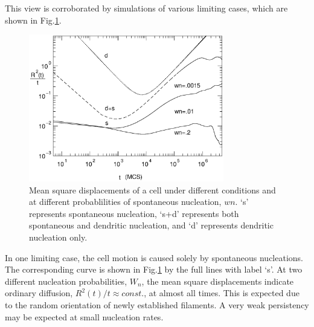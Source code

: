 \documentclass[aps,preprint,pre,array,epsfig,eqsecnum]{revtex4}
\begin{document}
This view is corroborated by simulations of various limiting cases, which are
shown in Fig.\ref{fig:msd}.
\begin{figure}[h] %
  \begin{center}
    \includegraphics[width=0.76\textwidth, angle=0]
{Nandy4.eps}    
    \caption{Mean square displacements of a cell under different 
    conditions and at different probablilities of spontaneous nucleation, $wn$.
     `s' represents spontaneous nucleation, `s+d' represents both 
     spontaneous and dendritic nucleation, and `d' represents  dendritic
     nucleation only.}  
    \label{fig:msd}
  \end{center}
\end{figure}
%

In one limiting case, the cell motion is caused solely by spontaneous
nucleations.
The corresponding curve 
is shown in Fig.\ref{fig:msd} by the full lines with label `s'.
At two different nucleation probabilities, $W_n$, the mean square
displacements indicate
ordinary diffusion, $R^2(t)/t \approx const.$, at almost all times.
This is expected due to the random orientation of newly established
filaments. A very weak persistency may be expected at small nucleation rates.
\end{document}
